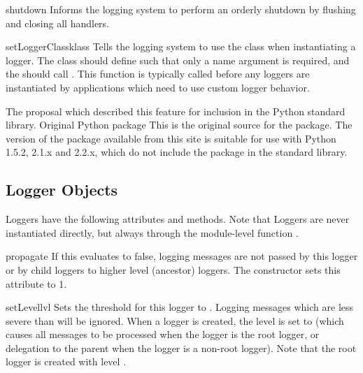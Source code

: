 \begin{funcdesc}{shutdown}{}
Informs the logging system to perform an orderly shutdown by flushing and
closing all handlers.
\end{funcdesc}

\begin{funcdesc}{setLoggerClass}{klass}
Tells the logging system to use the class  when instantiating a
logger. The class should define  such that only a name
argument is required, and the  should call
. This function is typically called before any
loggers are instantiated by applications which need to use custom logger
behavior.
\end{funcdesc}


\begin{seealso}
         {The proposal which described this feature for inclusion in
          the Python standard library.}
          {Original Python  package}
          {This is the original source for the 
           package.  The version of the package available from this
           site is suitable for use with Python 1.5.2, 2.1.x and 2.2.x,
           which do not include the  package in the standard
           library.}
\end{seealso}


\subsection{Logger Objects}

Loggers have the following attributes and methods. Note that Loggers are
never instantiated directly, but always through the module-level function
.

\begin{datadesc}{propagate}
If this evaluates to false, logging messages are not passed by this
logger or by child loggers to higher level (ancestor) loggers. The
constructor sets this attribute to 1.
\end{datadesc}

\begin{methoddesc}{setLevel}{lvl}
Sets the threshold for this logger to . Logging messages
which are less severe than  will be ignored. When a logger is
created, the level is set to  (which causes all messages
to be processed when the logger is the root logger, or delegation to the
parent when the logger is a non-root logger). Note that the root logger
is created with level .
\end{methoddesc}

